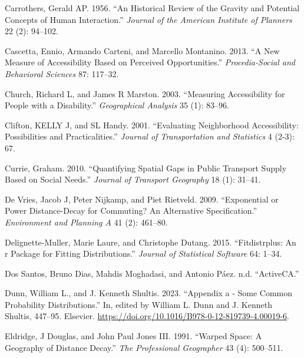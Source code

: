 \documentclass[preprint, 3p,
authoryear]{elsarticle} %
\newlength{\cslhangindent}
\newlength{\cslentryspacingunit} %
\newenvironment{CSLReferences}[2] %
 {%
  \setlength{\parindent}{0pt}
  \ifodd #1
  \let\oldpar\par
  \def\par{\hangindent=\cslhangindent\oldpar}
  \fi
  \setlength{\parskip}{#2\cslentryspacingunit}
 }%
 {}
\begin{document}
\begin{CSLReferences}{1}{0}
\leavevmode{}%
Carrothers, Gerald AP. 1956. {``An Historical Review of the Gravity and
Potential Concepts of Human Interaction.''} \emph{Journal of the
American Institute of Planners} 22 (2): 94--102.

\leavevmode{}%
Cascetta, Ennio, Armando Carteni, and Marcello Montanino. 2013. {``A New
Measure of Accessibility Based on Perceived Opportunities.''}
\emph{Procedia-Social and Behavioral Sciences} 87: 117--32.

\leavevmode{}%
Church, Richard L, and James R Marston. 2003. {``Measuring Accessibility
for People with a Disability.''} \emph{Geographical Analysis} 35 (1):
83--96.

\leavevmode{}%
Clifton, KELLY J, and SL Handy. 2001. {``Evaluating Neighborhood
Accessibility: Possibilities and Practicalities.''} \emph{Journal of
Transportation and Statistics} 4 (2-3): 67.

\leavevmode{}%
Currie, Graham. 2010. {``Quantifying Spatial Gaps in Public Transport
Supply Based on Social Needs.''} \emph{Journal of Transport Geography}
18 (1): 31--41.

\leavevmode{}%
De Vries, Jacob J, Peter Nijkamp, and Piet Rietveld. 2009.
{``Exponential or Power Distance-Decay for Commuting? An Alternative
Specification.''} \emph{Environment and Planning A} 41 (2): 461--80.

\leavevmode{}%
Delignette-Muller, Marie Laure, and Christophe Dutang. 2015.
{``Fitdistrplus: An r Package for Fitting Distributions.''}
\emph{Journal of Statistical Software} 64: 1--34.

\leavevmode{}%
Dos Santos, Bruno Dias, Mahdis Moghadasi, and Antonio Páez. n.d.
{``ActiveCA.''}

\leavevmode{}%
Dunn, William L., and J. Kenneth Shultis. 2023. {``Appendix a - Some
Common Probability Distributions.''} In, edited by William L. Dunn and
J. Kenneth Shultis, 447--95. Elsevier.
\url{https://doi.org/10.1016/B978-0-12-819739-4.00019-6}.

\leavevmode{}%
Eldridge, J Douglas, and John Paul Jones III. 1991. {``Warped Space: A
Geography of Distance Decay.''} \emph{The Professional Geographer} 43
(4): 500--511.


\end{CSLReferences}
\end{document}
